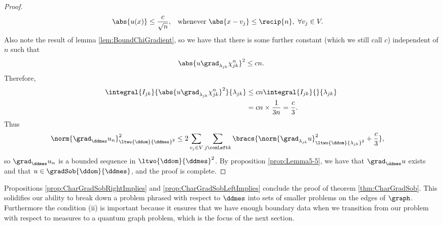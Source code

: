 \begin{proof}
\begin{align*}
		\abs{ u(x) } \leq \frac{c}{\sqrt{n}}, &\quad\text{whenever } \abs{x-v_j}\leq\recip{n}, \ \forall v_j\in V.
	\end{align*}
	Also note the result of lemma \ref{lem:BoundChiGradient}, so we have that there is some further constant (which we still call $c$) independent of $n$ such that
	\begin{align*}
		\abs{u\grad_{\lambda_{jk}}\chi_{jk}^n}^2 \leq cn.
	\end{align*}
	Therefore,
	\begin{align*}
		\integral{I_{jk}}{\abs{ u\grad_{\lambda_{jk}}\chi_{jk}^n }^2}{\lambda_{jk}}
		&\leq cn\integral{I_{jk}}{}{\lambda_{jk}} \\
		&= cn\times\frac{1}{3n} = \frac{c}{3} .
	\end{align*}
	Thus
	\begin{align*}
		\norm{\grad_{\ddmes}u_n}_{\ltwo{\ddom}{\ddmes}^2}^2
		&\leq 2\sum_{v_j\in V}\sum_{j\conLeft k}\bracs{ \norm{\grad_{\lambda_{jk}}u}_{\ltwo{\ddom}{\lambda_{jk}}^2}^2 + \frac{c}{3}},
	\end{align*}
	so $\grad_{\ddmes}u_n$ is a bounded sequence in $\ltwo{\ddom}{\ddmes}^2$.
	By proposition \ref{prop:Lemma5-5}, we have that $\grad_\ddmes u$ exists and that
	$u\in\gradSob{\ddom}{\ddmes}$, and the proof is complete.
\end{proof}

Propositions \ref{prop:CharGradSobRightImplies} and \ref{prop:CharGradSobLeftImplies}  conclude the proof of theorem \ref{thm:CharGradSob}.
This solidifies our ability to break down a problem phrased with respect to $\ddmes$ into sets of smaller problems on the edges of $\graph$.
Furthermore the condition (ii) is important because it ensures that we have enough boundary data when we transition from our problem with respect to measures to a quantum graph problem, which is the focus of the next section.

